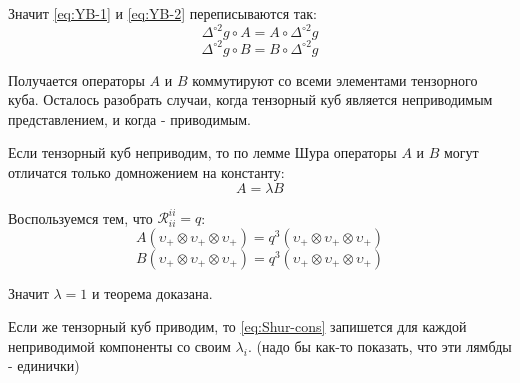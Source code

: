 \documentclass[12pt,a4paper]{article}
\begin{document}
Значит \eqref{eq:YB-1} и \eqref{eq:YB-2} переписываются так:
\begin{equation}
    \Delta^{\circ 2} g \circ A = A \circ \Delta^{\circ 2} g
\end{equation}
\begin{equation}
    \Delta^{\circ 2} g \circ B = B \circ \Delta^{\circ 2} g
\end{equation}

Получается операторы $A$ и $B$ коммутируют со всеми элементами
тензорного куба. Осталось разобрать случаи, когда тензорный куб
является неприводимым представлением, и когда - приводимым.

Если тензорный куб неприводим, то по лемме Шура операторы $A$ и $B$
могут отличатся только домножением на константу:
\begin{equation}
    A = \lambda B
    \label{eq:Shur-cons}
\end{equation}

Воспользуемся тем, что $\mathcal{R}^{ii}_{ii} = q$:
\begin{equation}
    A(\upsilon_+ \otimes \upsilon_+ \otimes \upsilon_+) = q^3 (\upsilon_+ \otimes \upsilon_+ \otimes \upsilon_+)
\end{equation}
\begin{equation}
    B(\upsilon_+ \otimes \upsilon_+ \otimes \upsilon_+) = q^3 (\upsilon_+ \otimes \upsilon_+ \otimes \upsilon_+)
\end{equation}

Значит $\lambda = 1$ и теорема доказана.

Если же тензорный куб приводим, то \eqref{eq:Shur-cons} запишется
для каждой неприводимой компоненты со своим $\lambda_i$. (надо бы
как-то показать, что эти лямбды - единички)


\printbibliography
\end{document}
